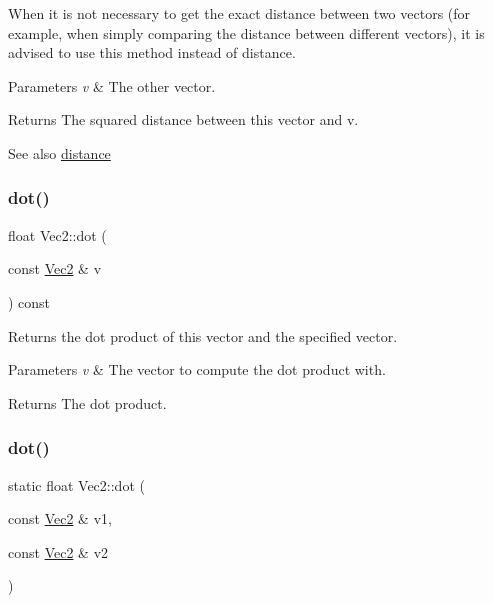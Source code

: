 When it is not necessary to get the exact distance between two vectors (for example, when simply comparing the distance between different vectors), it is advised to use this method instead of distance.


\begin{DoxyParams}{Parameters}
{\em v} & The other vector.\\
\hline
\end{DoxyParams}
\begin{DoxyReturn}{Returns}
The squared distance between this vector and v.
\end{DoxyReturn}
\begin{DoxySeeAlso}{See also}
\hyperlink{classVec2_a95cf4ec6593042a5c19186828f53d146}{distance} 
\end{DoxySeeAlso}
\mbox{\label{classVec2_a0077f35f41e7499847b5332a0ce42438}} 
\subsubsection{\texorpdfstring{dot()}{dot()}\hspace{0.1cm}{\footnotesize\ttfamily [1/4]}}
{\footnotesize\ttfamily float Vec2\+::dot (\begin{DoxyParamCaption}\item[{const \hyperlink{classVec2}{Vec2} \&}]{v }\end{DoxyParamCaption}) const\hspace{0.3cm}{\ttfamily [inline]}}

Returns the dot product of this vector and the specified vector.


\begin{DoxyParams}{Parameters}
{\em v} & The vector to compute the dot product with.\\
\hline
\end{DoxyParams}
\begin{DoxyReturn}{Returns}
The dot product. 
\end{DoxyReturn}
\mbox{\label{classVec2_ab2482a8fb50ff53c53ac024a899dad44}} 
\subsubsection{\texorpdfstring{dot()}{dot()}\hspace{0.1cm}{\footnotesize\ttfamily [2/4]}}
{\footnotesize\ttfamily static float Vec2\+::dot (\begin{DoxyParamCaption}\item[{const \hyperlink{classVec2}{Vec2} \&}]{v1,  }\item[{const \hyperlink{classVec2}{Vec2} \&}]{v2 }\end{DoxyParamCaption})\hspace{0.3cm}{\ttfamily [static]}}

